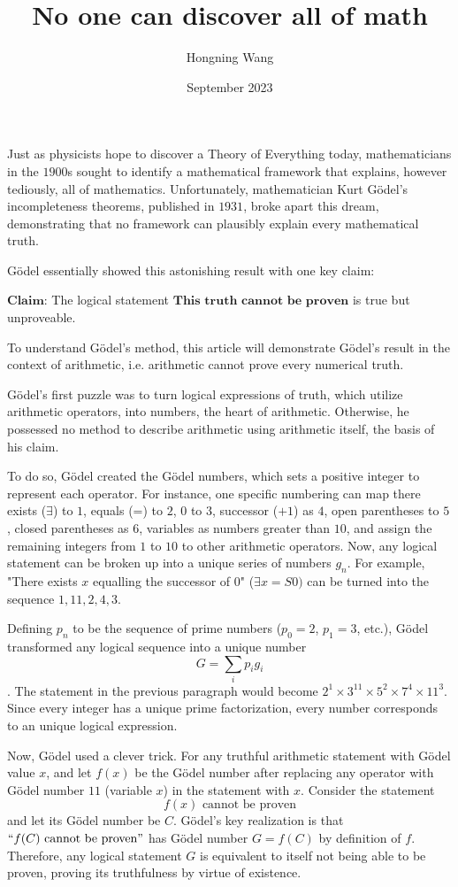 \documentclass{article}
\title{No one can discover all of math}
\author{Hongning Wang}
\date{September 2023}
\begin{document}
\maketitle

Just as physicists hope to discover a Theory of Everything today, mathematicians in the $1900$s sought to identify a mathematical framework that explains, however tediously, all of mathematics. Unfortunately, mathematician Kurt Gödel's incompleteness theorems, published in $1931$, broke apart this dream, demonstrating that no framework can plausibly explain every mathematical truth. 

Gödel essentially showed this astonishing result with one key claim: 

$\textbf{Claim:}$ The logical statement $\textbf{This truth cannot be proven}$ is true but unproveable.

To understand Gödel's method, this article will demonstrate Gödel's result in the context of arithmetic, i.e. arithmetic cannot prove every numerical truth. 

Gödel's first puzzle was to turn logical expressions of truth, which utilize arithmetic operators, into numbers, the heart of arithmetic. Otherwise, he possessed no method to describe arithmetic using arithmetic itself, the basis of his claim. 

To do so, Gödel created the Gödel numbers, which sets a positive integer to represent each operator. For instance, one specific numbering can map there exists ($\exists$) to $1$, equals (=) to $2$, $0$ to $3$, successor ($+1$) as $4$, open parentheses to $5$, closed parentheses as $6$, variables as numbers greater than $10$, and assign the remaining integers from $1$ to $10$ to other arithmetic operators. Now, any logical statement can be broken up into a unique series of numbers $g_n$. For example, "There exists $x$ equalling the successor of $0$" ($\exists x = S0)$ can be turned into the sequence $1, 11, 2, 4, 3.$

Defining $p_n$ to be the sequence of prime numbers ($p_0 = 2$, $p_1 = 3$, etc.), Gödel transformed any logical sequence into a unique number \[G = \sum_{i} p_i g_i\]. The statement in the previous paragraph would become $2^1 \times 3^{11} \times 5^2 \times 7^4 \times 11^3$. Since every integer has a unique prime factorization, every number corresponds to an unique logical expression. 

Now, Gödel used a clever trick. For any truthful arithmetic statement with Gödel value $x$, and let $f(x)$ be the Gödel number after replacing any operator with Gödel number $11$ (variable $x$) in the statement with $x$. Consider the statement \[f(x) \text{ cannot be proven} \] and let its Gödel number be $C$. Gödel's key realization is that $``f(C) \text{ cannot be proven}"$ has Gödel number $G=f(C)$ by definition of $f$. Therefore, any logical statement $G$ is equivalent to itself not being able to be proven, proving its truthfulness by virtue of existence. 
\end{document}

